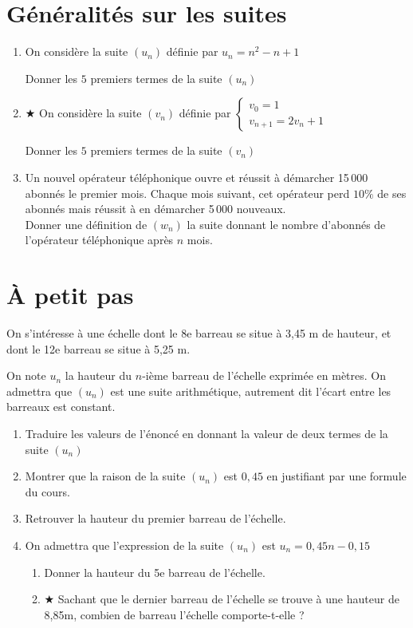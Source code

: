 \documentclass[oneside,12pt]{exam}          %
\begin{document}
\section{Généralités sur les suites}
\begin{enumerate}[itemsep = 0pt]
	\item On considère la suite $(u_n)$ définie par $u_n = n^2 - n + 1$ 
	
	Donner les $5$ premiers termes de la suite $(u_n)$
	
	\item $\bigstar$ On considère la suite $(v_n)$ définie par $\begin{cases} v_0 = 1 \\ v_{n+1} = 2v_n +1 \end{cases}$ 
	
	Donner les $5$ premiers termes de la suite $(v_n)$
	
	\item Un nouvel opérateur téléphonique ouvre et réussit à démarcher 15\,000 abonnés le premier mois. Chaque mois suivant, cet opérateur perd $10\%$ de ses abonnés mais réussit à en démarcher 5\,000 nouveaux. \\
	Donner une définition de $(w_n)$ la suite donnant le nombre d'abonnés de l'opérateur téléphonique après $n$ mois.
\end{enumerate}



\section{À petit pas}
On s'intéresse à une échelle dont le 8e barreau se situe à 3,45 m de hauteur, et dont le 12e barreau se situe à 5,25 m.

On note $u_n$ la hauteur du $n$-ième barreau de l'échelle exprimée en mètres. On admettra que $(u_n)$ est une suite arithmétique, autrement dit l'écart entre les barreaux est constant.
\begin{enumerate}[itemsep = 0pt]
	\item Traduire les valeurs de l'énoncé en donnant la valeur de deux termes de la suite $(u_n)$
	\item Montrer que la raison de la suite $(u_n)$ est $0,45$ en justifiant par une formule du cours.
	\item Retrouver la hauteur du premier barreau de l'échelle.
	\item On admettra que l'expression de la suite $(u_n)$ est $u_n = 0,45n - 0,15$
	\begin{enumerate}
		\item Donner la hauteur du 5e barreau de l'échelle.
		\item $\bigstar$ Sachant que le dernier barreau de l'échelle se trouve à une hauteur de 8,85m, combien de barreau l'échelle comporte-t-elle ?
	\end{enumerate}
\end{enumerate}
\end{document}
